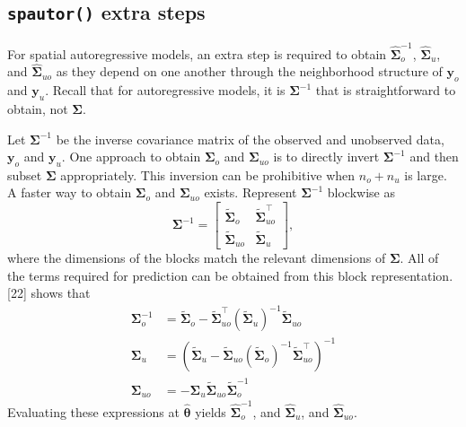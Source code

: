 \documentclass[10pt,letterpaper]{article}
\begin{document}
\hypertarget{spautor-extra-steps}{%
\subsection{\texorpdfstring{\texttt{spautor()} extra
steps}{spautor() extra steps}}\label{spautor-extra-steps}}

For spatial autoregressive models, an extra step is required to obtain
\(\hat{\boldsymbol{\Sigma}}^{-1}_o\), \(\hat{\boldsymbol{\Sigma}}_u\),
and \(\hat{\boldsymbol{\Sigma}}_{uo}\) as they depend on one another
through the neighborhood structure of \(\mathbf{y}_o\) and
\(\mathbf{y}_u\). Recall that for autoregressive models, it is
\(\boldsymbol{\Sigma}^{-1}\) that is straightforward to obtain, not
\(\boldsymbol{\Sigma}\).

Let \(\boldsymbol{\Sigma}^{-1}\) be the inverse covariance matrix of the
observed and unobserved data, \(\mathbf{y}_o\) and \(\mathbf{y}_u\). One
approach to obtain \(\boldsymbol{\Sigma}_o\) and
\(\boldsymbol{\Sigma}_{uo}\) is to directly invert
\(\boldsymbol{\Sigma}^{-1}\) and then subset \(\boldsymbol{\Sigma}\)
appropriately. This inversion can be prohibitive when \(n_o + n_u\) is
large. A faster way to obtain \(\boldsymbol{\Sigma}_o\) and
\(\boldsymbol{\Sigma}_{uo}\) exists. Represent
\(\boldsymbol{\Sigma}^{-1}\) blockwise as
\begin{equation*}\label{eq:auto_hw}
  \boldsymbol{\Sigma}^{-1} =
  \begin{bmatrix}
    \tilde{\boldsymbol{\Sigma}}_{o} & \tilde{\boldsymbol{\Sigma}}^{\top}_{uo} \\
    \tilde{\boldsymbol{\Sigma}}_{uo} & \tilde{\boldsymbol{\Sigma}}_{u}
  \end{bmatrix},
\end{equation*} where the dimensions of the blocks match the relevant
dimensions of \(\boldsymbol{\Sigma}\). All of the terms required for
prediction can be obtained from this block representation. {[}22{]}
shows that \begin{equation*}\label{eq:hw_forms}
  \begin{split}
    \boldsymbol{\Sigma}^{-1}_o & = \tilde{\boldsymbol{\Sigma}}_{o} - \tilde{\boldsymbol{\Sigma}}^{ \top}_{uo} (\tilde{\boldsymbol{\Sigma}}_{u})^{-1} \tilde{\boldsymbol{\Sigma}}_{uo} \\
    \boldsymbol{\Sigma}_u & = (\tilde{\boldsymbol{\Sigma}}_{u} - \tilde{\boldsymbol{\Sigma}}_{uo} (\tilde{\boldsymbol{\Sigma}}_{o})^{-1} \tilde{\boldsymbol{\Sigma}}^\top_{uo})^{-1} \\
    \boldsymbol{\Sigma}_{uo} & = - \boldsymbol{\Sigma}_u \tilde{\boldsymbol{\Sigma}}_{uo} \tilde{\boldsymbol{\Sigma}}^{-1}_{o}
  \end{split}
\end{equation*} Evaluating these expressions at
\(\hat{\boldsymbol{\theta}}\) yields
\(\hat{\boldsymbol{\Sigma}}^{-1}_o\), and
\(\hat{\boldsymbol{\Sigma}}_u\), and \(\hat{\boldsymbol{\Sigma}}_{uo}\).
\end{document}
